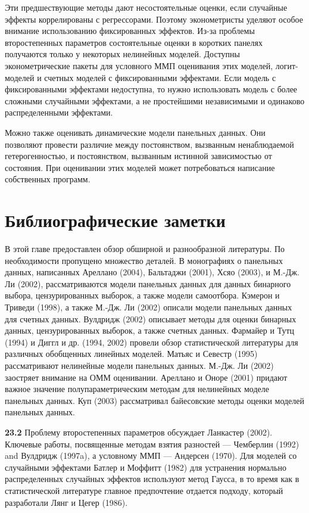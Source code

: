 Эти предшествующие методы дают несостоятельные оценки, если случайные эффекты коррелированы с регрессорами. Поэтому эконометристы уделяют особое внимание использованию фиксированных эффектов. Из-за проблемы второстепенных параметров состоятельные оценки в коротких панелях получаются только у некоторых нелинейных моделей. Доступны эконометрические пакеты для условного ММП оценивания этих моделей, логит-моделей и счетных моделей с фиксированными эффектами. Если модель с фиксированными эффектами недоступна, то нужно использовать модель с более сложными случайными эффектами, а не простейшими независимыми и одинаково распределенными эффектами.

Можно также оценивать динамические модели панельных данных. Они позволяют провести различие между постоянством, вызванным ненаблюдаемой гетерогенностью, и постоянством, вызванным истинной зависимостью от состояния. При оценивании этих моделей может потребоваться написание собственных программ.


\section{Библиографические заметки}

В этой главе предоставлен обзор обширной и разнообразной литературы. По необходимости пропущено множество деталей. В монографиях о панельных данных, написанных Ареллано (2004), Бальтаджи (2001), Хсяо (2003), и М.-Дж. Ли (2002), рассматриваются модели панельных данных для данных бинарного выбора, цензурированных выборок, а также модели самоотбора. Кэмерон и Триведи (1998), а также М.-Дж. Ли (2002) описали модели панельных данных для счетных данных. Вулдридж (2002) описывает методы для оценки бинарных данных, цензурированных выборок, а также счетных данных. Фармайер и Тутц (1994) и Диггл и др. (1994, 2002) провели обзор статистической литературы для различных обобщенных линейных моделей. Матьяс и Севестр (1995) рассматривают нелинейные модели панельных данных. М.-Дж. Ли (2002) заостряет внимание на ОММ оценивании. Ареллано и Оноре (2001) придают важное значение полупараметрическим методам для нелинейных моделе панельных данных. Куп (2003) рассматривал байесовские методы оценки моделей панельных данных.

\textbf{23.2} Проблему второстепенных параметров обсуждает Ланкастер (2002). Ключевые работы, посвященные методам взятия разностей ---  Чемберлин (1992) and Вулдридж (1997a), а условному ММП --- Андерсен (1970). Для моделей со случайными эффектами Батлер и Моффитт (1982) для устранения нормально распределенных случайных эффектов используют метод Гаусса, в то время как в статистической литературе главное предпочтение отдается подходу, который разработали Лянг и Цегер (1986).

